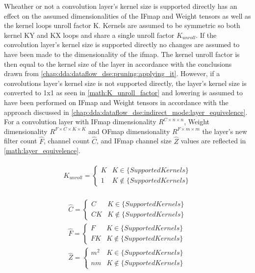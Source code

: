 Wheather or not a convolution layer's kernel size is supported directly has an effect on the assumed
dimensionalities of the IFmap and Weight tensors as well as the kernel loops
unroll factor K. Kernels are assumed to be symmetric so both kernel KY and KX
loops and share a single unroll factor $K_{unroll}$. If the convolution layer's
kernel size is supported directly no changes are assumed to have been made to
the dimensionality of the ifmap. The kernel unroll factor is then equal to the
kernel size of the layer in accordance with the conclusions drawn from
\autoref{chap:dda:dataflow_dse:pruning:applying_it}. However, if
a convolutions layer's kernel size is not supported directly, the layer's kernel
size is converted to 1x1 as seen in \autoref{math:K_unroll_factor} and lowering
is assumed to have been performed on IFmap and Weight tensors in accordance with
the approach discussed in \autoref{chap:dda:dataflow_dse:indirect_mode:layer_equivelence}. For a convolution
layer with IFmap dimensionality $R^{C\times n\times n}$, Weight dimensionality
$R^{F\times C\times K\times K}$ and OFmap dimensionality $R^{F\times m\times m}$
the layer's new filter count $\hat{F}$, channel count $\hat{C}$, and IFmap
channel size $\hat{Z}$ values are reflected in \autoref{math:layer_equivelence}. 

\begin{align}
    \begin{gathered}
        K_{unroll} = \begin{cases} K & K \in \{SupportedKernels\}\\1 &K \notin \{SupportedKernels\}\end{cases}
            \end{gathered}
    \label{math:K_unroll_factor}
\end{align}

\begin{align}
    \begin{gathered}
        \hat{C} = \begin{cases} C &  K \in \{SupportedKernels\}\\ CK & K \notin \{SupportedKernels\}\end{cases} \\
        \hat{F} = \begin{cases} F &  K \in \{SupportedKernels\}\\ FK & K \notin \{SupportedKernels\}\end{cases} \\
        \hat{Z} = \begin{cases} m^2 &  K \in \{SupportedKernels\}\\ nm & K \notin \{SupportedKernels\}\end{cases}
            \end{gathered}
    \label{math:layer_equivelence}
\end{align}

